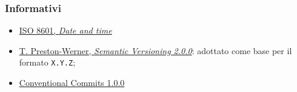 \subsubsection{Informativi}
\begin{itemize}
	\item \href{https://www.iso.org/iso-8601-date-and-time-format.html}{ISO 8601, \textit{Date and time}}
	\item \href{https://semver.org/}{T. Preston-Werner, \textit{Semantic Versioning 2.0.0}}: adottato come base per il formato \texttt{X.Y.Z};
	\item \href{https://www.conventionalcommits.org/en/v1.0.0/}{Conventional Commits 1.0.0}
\end{itemize}
